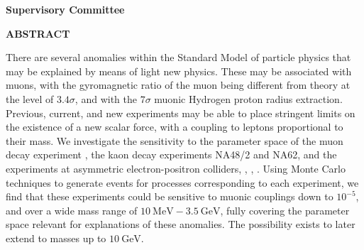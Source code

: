 \newpage
{}

\noindent \textbf{Supervisory Committee}
\tpbreak
\panel

\begin{center}
\textbf{ABSTRACT}
\end{center}

There are several anomalies within the Standard Model of particle physics that may be explained by means of light new physics.
These may be associated with muons, with the gyromagnetic ratio of the muon being different from theory at the level of $3.4\sigma$, and with the $7\sigma$ muonic Hydrogen proton radius extraction.
Previous, current, and new experiments may be able to place stringent limits on the existence of a new scalar force, with a coupling to leptons proportional to their mass.
We investigate the sensitivity to the parameter space of the muon decay experiment \mueee, the kaon decay experiments NA48/2 and NA62, and the experiments at asymmetric electron-positron colliders, \babar, \belle, \belletwo.
Using Monte Carlo techniques to generate events for processes corresponding to each experiment, we find that these experiments could be sensitive to muonic couplings down to $10^{-5}$, and over a wide mass range of $10~\textrm{MeV} - 3.5~\textrm{GeV}$, fully covering the parameter space relevant for explanations of these anomalies.
The possibility exists to later extend to masses up to $10~\textrm{GeV}$.
